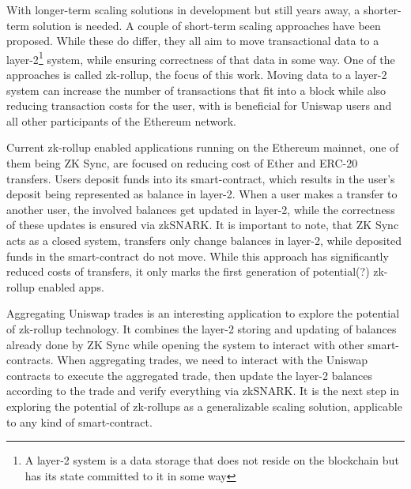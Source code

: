 \documentclass[../thesis.tex]{subfiles}
\begin{document}
With longer-term scaling solutions in development but still years away, a shorter-term solution is needed. A couple of short-term scaling approaches have been proposed. While these do differ, they all aim to move transactional data to a layer-2\footnote{A layer-2 system is a data storage that does not reside on the blockchain but has its state committed to it in some way} system, while ensuring correctness of that data in some way. One of the approaches is called zk-rollup, the focus of this work. Moving data to a layer-2 system can increase the number of transactions that fit into a block while also reducing transaction costs for the user, with is beneficial for Uniswap users and all other participants of the Ethereum network. 

Current zk-rollup enabled applications running on the Ethereum mainnet, one of them being ZK Sync, are focused on reducing cost of Ether and ERC-20 transfers. Users deposit funds into its smart-contract, which results in the user's deposit being represented as balance in layer-2. When a user makes a transfer to another user, the involved balances get updated in layer-2, while the correctness of these updates is ensured via zkSNARK. It is important to note, that ZK Sync acts as a closed system, transfers only change balances in layer-2, while deposited funds in the smart-contract do not move. While this approach has significantly reduced costs of transfers, it only marks the first generation of potential(?) zk-rollup enabled apps.

Aggregating Uniswap trades is an interesting application to explore the potential of zk-rollup technology. It combines the layer-2 storing and updating of balances already done by ZK Sync while opening the system to interact with other smart-contracts. When aggregating trades, we need to interact with the Uniswap contracts to execute the aggregated trade, then update the layer-2 balances according to the trade and verify everything via zkSNARK. It is the next step in exploring the potential of zk-rollups as a generalizable scaling solution, applicable to any kind of smart-contract. 
\end{document}
